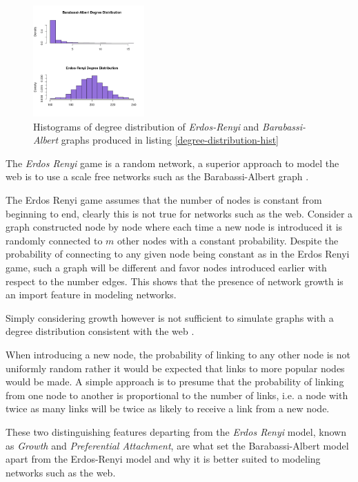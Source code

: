 \documentclass[11pt, twoside]{report}
\begin{document}
\begin{figure}
\includegraphics[width=0.38\textwidth]{media/degree_dist_er_ba.png}
\caption{\label{fig:degree-distribution-hist}Histograms of degree distribution of \textit{Erdos-Renyi} and \textit{Barabassi-Albert} graphs produced in listing \ref{degree-distribution-hist}}
\end{figure}

The \emph{Erdos Renyi} game is a random network, a superior approach to model the web
is to use a scale free networks \cite{barabasiPhysicsWeb2001} such as the
Barabassi-Albert graph \cite{barabasiScalefreeCharacteristicsRandom2000}.


The Erdos Renyi game assumes that the number of nodes is constant from beginning
to end, clearly this is not true for networks such as the web. Consider a graph
constructed node by node where each time a new node is introduced it is randomly
connected to \(m\) other nodes with a constant probability. Despite the probability of
connecting to any given node being constant as in the Erdos Renyi game, such a
graph will be different and favor nodes introduced earlier with respect to the number edges.
This shows that the presence of network growth is an import feature in modeling
networks.

Simply considering growth however is not sufficient to simulate graphs with a
degree distribution consistent with the web
\cite[Ch. 7]{zengPracticalSimulationMethod2013}.

When introducing a new node, the probability of linking to any other node is not
uniformly random rather it would be
expected that links to more popular nodes would be made. A simple approach is to presume that the probability of linking from
one node to another is proportional to the number of links, i.e. a node with
twice as many links will be twice as likely to receive a link from a new node.

These two distinguishing features departing from the \emph{Erdos Renyi} model, known as \emph{Growth} and \emph{Preferential Attachment}, are what set the Barabassi-Albert model apart from the Erdos-Renyi model and why it is better suited to modeling networks such as the web. \cite[Ch. 7]{barabasiLinkedNewScience2002}
\end{document}
